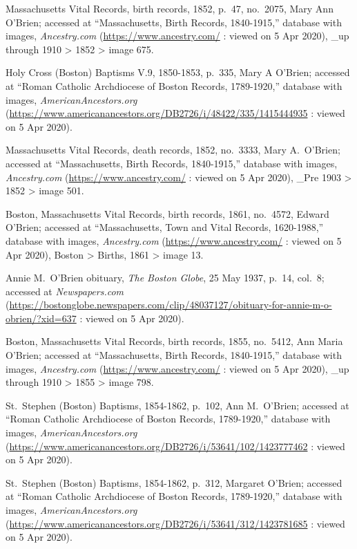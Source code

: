 \begin{thebibliography}{999}
	Massachusetts Vital Records, birth records, 1852, p.\ 47, no.\ 2075, Mary Ann O'Brien; accessed at ``Massachusetts, Birth Records, 1840-1915,'' database with images, \textit{Ancestry.com} (\url{https://www.ancestry.com/} : viewed on 5 Apr 2020), \_up through 1910 > 1852 > image 675.
	
	Holy Cross (Boston) Baptisms V.9, 1850-1853, p.\ 335, Mary A O'Brien; accessed at ``Roman Catholic Archdiocese of Boston Records, 1789-1920,'' database with images, \textit{AmericanAncestors.org} (\url{https://www.americanancestors.org/DB2726/i/48422/335/1415444935} : viewed on 5 Apr 2020).
	
	Massachusetts Vital Records, death records, 1852, no.\ 3333, Mary A.\ O'Brien; accessed at ``Massachusetts, Birth Records, 1840-1915,'' database with images, \textit{Ancestry.com} (\url{https://www.ancestry.com/} : viewed on 5 Apr 2020), \_Pre 1903 > 1852 > image 501.
	
	Boston, Massachusetts Vital Records, birth records, 1861, no.\ 4572, Edward O'Brien; accessed at ``Massachusetts, Town and Vital Records, 1620-1988,'' database with images, \textit{Ancestry.com} (\url{https://www.ancestry.com/} : viewed on 5 Apr 2020), Boston > Births, 1861 > image 13.

	Annie M.\ O'Brien obituary, \textit{The Boston Globe}, 25 May 1937, p.\ 14, col.\ 8; accessed at \textit{Newspapers.com} (\url{https://bostonglobe.newspapers.com/clip/48037127/obituary-for-annie-m-o-obrien/?xid=637} : viewed on 5 Apr 2020).
	
	Boston, Massachusetts Vital Records, birth records, 1855, no.\ 5412, Ann Maria O'Brien; accessed at ``Massachusetts, Birth Records, 1840-1915,'' database with images, \textit{Ancestry.com} (\url{https://www.ancestry.com/} : viewed on 5 Apr 2020), \_up through 1910 > 1855 > image 798.
	
	St.\ Stephen (Boston) Baptisms, 1854-1862, p.\ 102, Ann M.\ O'Brien; accessed at ``Roman Catholic Archdiocese of Boston Records, 1789-1920,'' database with images, \textit{AmericanAncestors.org} (\url{https://www.americanancestors.org/DB2726/i/53641/102/1423777462} : viewed on 5 Apr 2020).
	
	St.\ Stephen (Boston) Baptisms, 1854-1862, p.\ 312, Margaret O'Brien; accessed at ``Roman Catholic Archdiocese of Boston Records, 1789-1920,'' database with images, \textit{AmericanAncestors.org} (\url{https://www.americanancestors.org/DB2726/i/53641/312/1423781685} : viewed on 5 Apr 2020).	
	

\end{thebibliography}
